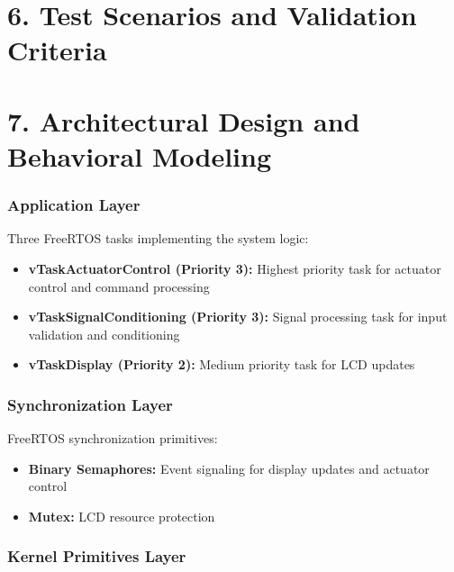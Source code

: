 \documentclass[12pt]{article}
\begin{document}
\section*{6. Test Scenarios and Validation Criteria}



\section*{7. Architectural Design and Behavioral Modeling}

\subsubsection*{Application Layer}

Three FreeRTOS tasks implementing the system logic:
\begin{itemize}
    \item \textbf{vTaskActuatorControl (Priority 3):} Highest priority task for actuator control and command processing
    \item \textbf{vTaskSignalConditioning (Priority 3):} Signal processing task for input validation and conditioning
    \item \textbf{vTaskDisplay (Priority 2):} Medium priority task for LCD updates
\end{itemize}

\subsubsection*{Synchronization Layer}

FreeRTOS synchronization primitives:
\begin{itemize}
    \item \textbf{Binary Semaphores:} Event signaling for display updates and actuator control
    \item \textbf{Mutex:} LCD resource protection
\end{itemize}

\subsubsection*{Kernel Primitives Layer}
\end{document}
